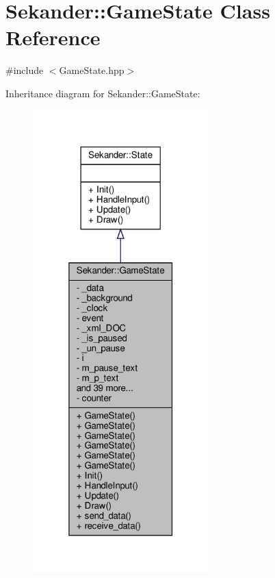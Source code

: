 \hypertarget{classSekander_1_1GameState}{}\section{Sekander\+:\+:Game\+State Class Reference}
\label{classSekander_1_1GameState}


{\ttfamily \#include $<$Game\+State.\+hpp$>$}



Inheritance diagram for Sekander\+:\+:Game\+State\+:
\nopagebreak
\begin{figure}[H]
\begin{center}
\leavevmode
\includegraphics[width=193pt]{classSekander_1_1GameState__inherit__graph}
\end{center}
\end{figure}


